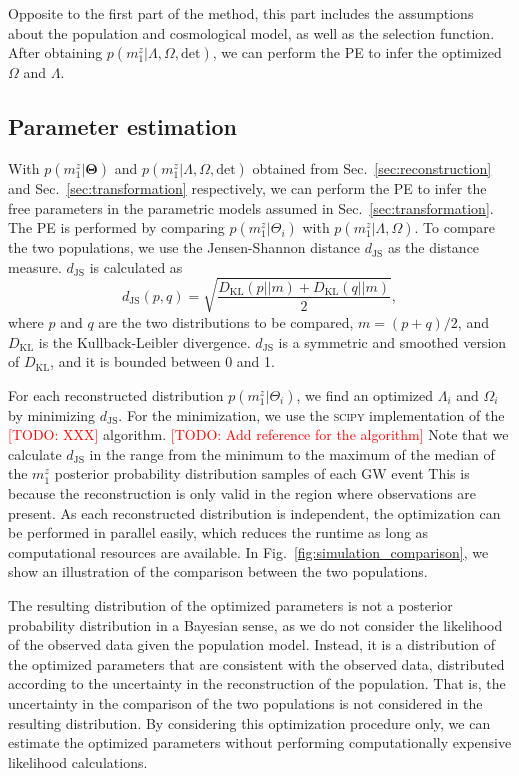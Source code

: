 \documentclass[twocolumn]{aastex631}
\newcommand{\todo}[1]{\textcolor{red}{[TODO: #1]}}
\begin{document}
Opposite to the first part of the method, this part includes the assumptions about the population and cosmological model, as well as the selection function.
After obtaining $p(m^z_1|\Lambda, \Omega, \mathrm{det})$, we can perform the \ac{PE} to infer the optimized $\Omega$ and $\Lambda$.

\subsection{Parameter estimation}
\label{sec:pe}

With $p(m^z_1|\mathbf{\Theta})$ and $p(m^z_1|\Lambda, \Omega, \mathrm{det})$ obtained from Sec.~\ref{sec:reconstruction} and Sec.~\ref{sec:transformation} respectively, we can perform the \ac{PE} to infer the free parameters in the parametric models assumed in Sec.~\ref{sec:transformation}.
The \ac{PE} is performed by comparing $p(m^z_1|\Theta_i)$ with $p(m^z_1|\Lambda, \Omega)$.
To compare the two populations, we use the Jensen-Shannon distance $d_\mathrm{JS}$ as the distance measure.
$d_\mathrm{JS}$ is calculated as
\begin{equation}
    d_\mathrm{JS}(p, q) = \sqrt{\frac{D_\mathrm{KL}(p||m) + D_\mathrm{KL}(q||m)}{2}},
\end{equation}
where $p$ and $q$ are the two distributions to be compared, $m = (p + q) / 2$, and $D_\mathrm{KL}$ is the Kullback-Leibler divergence.
$d_\mathrm{JS}$ is a symmetric and smoothed version of $D_\mathrm{KL}$, and it is bounded between 0 and 1.

For each reconstructed distribution $p(m^z_1|\Theta_i)$, we find an optimized $\Lambda_i$ and $\Omega_i$ by minimizing $d_\mathrm{JS}$.
For the minimization, we use the \textsc{scipy} \citep{2020SciPy-NMeth} implementation of the \todo{XXX} algorithm. \todo{Add reference for the algorithm}
Note that we calculate $d_\mathrm{JS}$ in the range from the minimum to the maximum of the median of the $m^z_1$ posterior probability distribution samples of each \ac{GW} event
This is because the reconstruction is only valid in the region where observations are present.
As each reconstructed distribution is independent, the optimization can be performed in parallel easily, which reduces the runtime as long as computational resources are available.
In Fig.~\ref{fig:simulation_comparison}, we show an illustration of the comparison between the two populations.

The resulting distribution of the optimized parameters is not a posterior probability distribution in a Bayesian sense, as we do not consider the likelihood of the observed data given the population model.
Instead, it is a distribution of the optimized parameters that are consistent with the observed data, distributed according to the uncertainty in the reconstruction of the population.
That is, the uncertainty in the comparison of the two populations is not considered in the resulting distribution.
By considering this optimization procedure only, we can estimate the optimized parameters without performing computationally expensive likelihood calculations.
\end{document}

